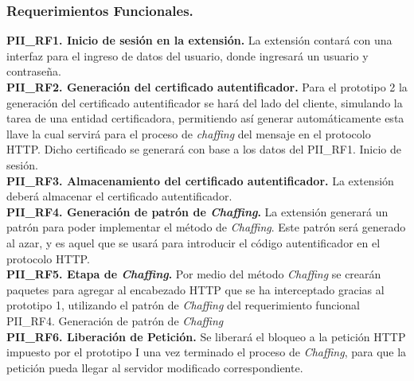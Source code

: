 \documentclass[12pt, a4paper, titlepage]{report}
\begin{document}
				\subsubsection{Requerimientos Funcionales.}
				{\setlength{\parindent}{12pt}
				
				\textbf{PII\_RF1. Inicio de sesi\'on en la extensi\'on.} La extensi\'on contar\'a con una interfaz para el ingreso de datos del usuario, donde ingresará un usuario y contraseña. \\   
                
                \textbf{PII\_RF2. Generación del certificado autentificador.} Para el prototipo 2 la generación del certificado autentificador se har\'a del lado del cliente, simulando la tarea de una entidad certificadora, permitiendo as\'i generar automáticamente esta llave la cual servir\'a para el proceso de \textit{chaffing} del mensaje en el protocolo HTTP. Dicho certificado se generará con base a los datos del PII\_RF1. Inicio de sesión.\\
                
                \textbf{PII\_RF3. Almacenamiento del certificado autentificador.} La extensi\'on deberá almacenar el certificado autentificador.\\
                
                \textbf{PII\_RF4. Generación de patrón de \textit{Chaffing}.} La extensión generará un patrón para poder implementar el método de \textit{Chaffing}. Este patrón será generado al azar, y es aquel que se usará para introducir el código autentificador en el protocolo HTTP.\\
                
				\textbf{PII\_RF5. Etapa de \textit{Chaffing}.} Por medio del m\'etodo \textit{Chaffing} se crearán paquetes para agregar al encabezado HTTP que se ha interceptado gracias al prototipo 1, utilizando el patrón de \textit{Chaffing} del requerimiento funcional PII\_RF4. Generación de patrón de \textit{Chaffing}\\
                    
                    
                \textbf{PII\_RF6. Liberaci\'on de Petición.} Se liberar\'a el bloqueo a la petici\'on HTTP impuesto por el prototipo I una vez terminado el proceso de \textit{Chaffing}, para que la petici\'on pueda llegar al servidor modificado correspondiente.\\
                
}
\end{document}

